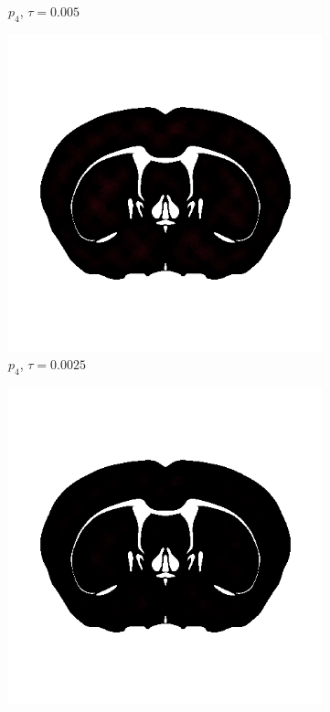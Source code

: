 \begin{figure}[h!]
\begin{subfigure}[b]{0.24\textwidth}
    \caption{$p_4$, $\tau=0.005$}
  \end{subfigure}
  \begin{subfigure}[b]{0.24\textwidth}
    \includegraphics[width=\textwidth,height=\textheight,keepaspectratio,height=\textheight,keepaspectratio]{figures/4_mpet/biomedical/time/eta4_p4_dt3.png}
    \caption{$p_4$, $\tau=0.0025$}
  \end{subfigure}
  \begin{subfigure}[b]{0.24\textwidth}
    \includegraphics[width=\textwidth,height=\textheight,keepaspectratio,height=\textheight,keepaspectratio]{figures/4_mpet/biomedical/time/eta4_p4_dt4.png}

\end{subfigure}
\end{figure}
